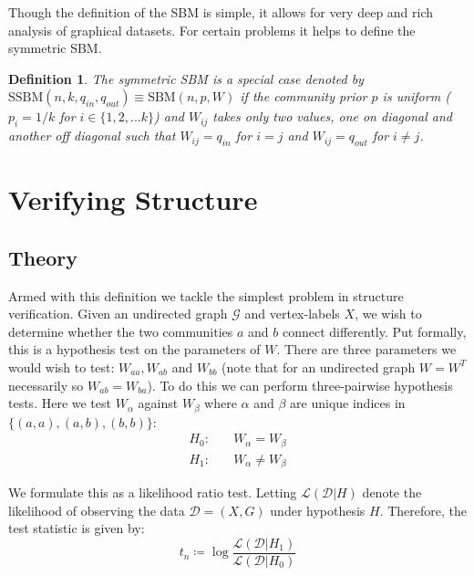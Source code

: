 \documentclass[]{article}
\newcommand{\Dcal}{\mathcal{D}}
\newcommand{\Gcal}{\mathcal{G}}
\newcommand{\lik}{\mathcal{L}}
\newtheorem{definition}{Definition}[section]
\begin{document}
Though the definition of the SBM is simple, it allows for very deep and rich analysis of graphical datasets. For certain problems it helps to define the symmetric SBM.

\begin{definition}
	\label{defn:sym-sbm}
	The symmetric SBM is a special case denoted by $\textrm{SSBM}(n, k, q_{in}, q_{out}) \equiv \textrm{SBM}(n, p, W)$ if the community prior $p$ is uniform ($p_i = 1/k$ for $i \in \{1, 2, \dots k\}$) and $W_{ij}$ takes only two values, one on diagonal and another off diagonal such that $W_{ij} = q_{in}$ for $i=j$ and $W_{ij} = q_{out}$ for $i \neq j$.
\end{definition}

\section{Verifying Structure}
\subsection{Theory}

Armed with this definition we tackle the simplest problem in structure verification. Given an undirected graph $\Gcal$ and vertex-labels $X$, we wish to determine whether the two communities $a$ and $b$ connect differently. Put formally, this is a hypothesis test on the parameters of $W$. There are three parameters we would wish to test: $W_{aa}, W_{ab}$ and $W_{bb}$ (note that for an undirected graph $W = W^T$ necessarily so $W_{ab} = W_{ba}$). To do this we can perform three-pairwise hypothesis tests. Here we test $W_{\alpha}$ against $W_{\beta}$ where $\alpha$ and $\beta$ are unique indices in $\{(a,a), (a, b), (b,b)\}$:
%
\begin{equation}
\begin{aligned}
	H_0:& \quad W_{\alpha} = W_{\beta} \\
	H_1:& \quad W_{\alpha} \neq W_{\beta}
\end{aligned}
\end{equation}

We formulate this as a likelihood ratio test. Letting $\lik(\Dcal | H)$ denote the likelihood of observing the data $\Dcal = (X, G)$ under hypothesis $H$. Therefore, the test statistic is given by:
%
\begin{equation}
	t_n \coloneqq \log \frac{\lik(\Dcal | H_1)}{\lik(\Dcal | H_0)}
	\label{eqn:test-statistic-start}
\end{equation}
\end{document}
